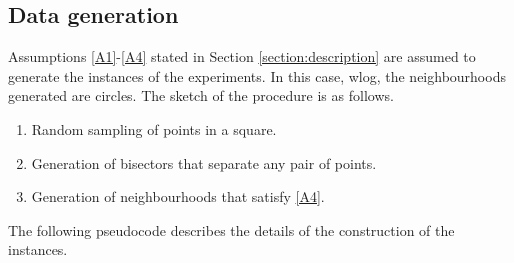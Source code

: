 \documentclass[a4paper,  review, authoryear, 1p.]{elsarticle}
\begin{document}
		
		\subsection{Data generation}\label{subsection:datageneration}
		Assumptions \ref{A1}-\ref{A4} stated in Section \ref{section:description} are assumed to generate the instances of the experiments. In this case, wlog, the neighbourhoods generated are circles. The sketch of the procedure is as follows. 
		
		\begin{enumerate}
			\item Random sampling of points in a square.
			\item Generation of bisectors that separate any pair of points.
			\item Generation of neighbourhoods that satisfy \ref{A4}.
		\end{enumerate}
		
		The following pseudocode describes the details of the construction of the instances.
		
\end{document}

